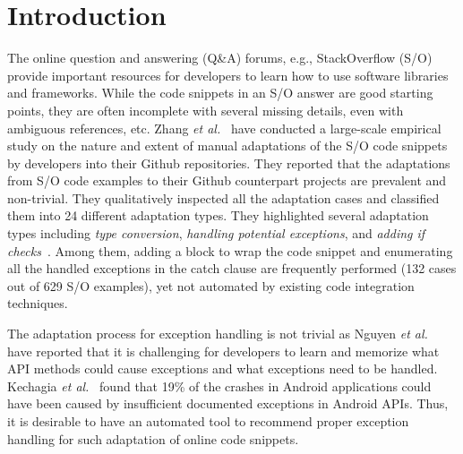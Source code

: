 \section{Introduction}
\label{sec:intro}

The online question and answering (Q\&A) forums, e.g., StackOverflow
(S/O) provide important resources for developers to learn how to use
software libraries and frameworks. While the code snippets in an S/O
answer are good starting points, they are often incomplete with
several missing details, even with ambiguous references, etc.  Zhang
{\em et al.}~\cite{zhang-icse19} have conducted a large-scale
empirical study on the nature and extent of manual adaptations of the
S/O code snippets by developers into their Github repositories.  They
reported that the adaptations from S/O code examples to their
Github counterpart projects are prevalent and non-trivial. They
qualitatively inspected all the adaptation cases and classified them
into 24 different adaptation types. They highlighted several
adaptation types including {\em type conversion}, {\em handling
  potential exceptions}, and {\em adding if
  checks}~\cite{zhang-icse19}. Among them, adding a 
block to wrap the code snippet and enumerating all the handled
exceptions in the catch clause are frequently performed (132 cases out
of 629 S/O examples), yet not automated by existing code integration
techniques.

The adaptation process for exception handling is not trivial as Nguyen
{\em et al.}~\cite{xrank-fse20} have reported that it is challenging
for developers to learn and memorize what API methods could cause
exceptions and what exceptions need to be handled. Kechagia {\em et
  al.}~\cite{kechagia-msr14} found that 19\% of the crashes in Android
applications could have been caused by insufficient documented
exceptions in Android APIs. Thus, it is desirable to have an automated
tool to recommend proper exception handling for such adaptation of
online code snippets.

